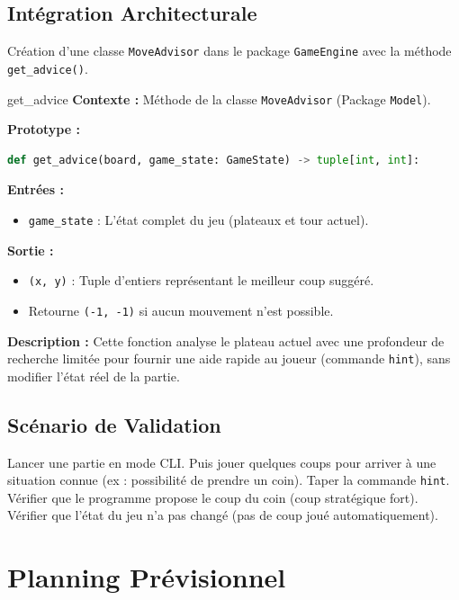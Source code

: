 \documentclass[a4paper]{article}
\begin{document}
\subsection{Intégration Architecturale}
Création d'une classe \texttt{MoveAdvisor} dans le package \texttt{GameEngine} avec la méthode \texttt{get\_advice()}.
\begin{signature}{get\_advice}
    \textbf{Contexte :} Méthode de la classe \texttt{MoveAdvisor} (Package \texttt{Model}).
    
    \textbf{Prototype :}
    \begin{lstlisting}[language=Python, frame=none, numbers=none, xleftmargin=0pt, basicstyle=\ttfamily\bfseries]
def get_advice(board, game_state: GameState) -> tuple[int, int]:
    \end{lstlisting}
    
    \textbf{Entrées :}
    \begin{itemize}
        \item \texttt{game\_state} : L'état complet du jeu (plateaux et tour actuel).
    \end{itemize}
    
    \textbf{Sortie :} 
    \begin{itemize}
        \item \texttt{(x, y)} : Tuple d'entiers représentant le meilleur coup suggéré.
        \item Retourne \texttt{(-1, -1)} si aucun mouvement n'est possible.
    \end{itemize}
    
    \textbf{Description :} 
    Cette fonction analyse le plateau actuel avec une profondeur de recherche limitée pour fournir une aide rapide au joueur (commande \texttt{hint}), sans modifier l'état réel de la partie.
\end{signature}

\subsection{Scénario de Validation}

    Lancer une partie en mode CLI. Puis jouer quelques coups pour arriver à une situation connue (ex : possibilité de prendre un coin). Taper la commande \texttt{hint}. Vérifier que le programme propose le coup du coin (coup stratégique fort). Vérifier que l'état du jeu n'a pas changé (pas de coup joué automatiquement).

\section{Planning Prévisionnel}
\end{document}
